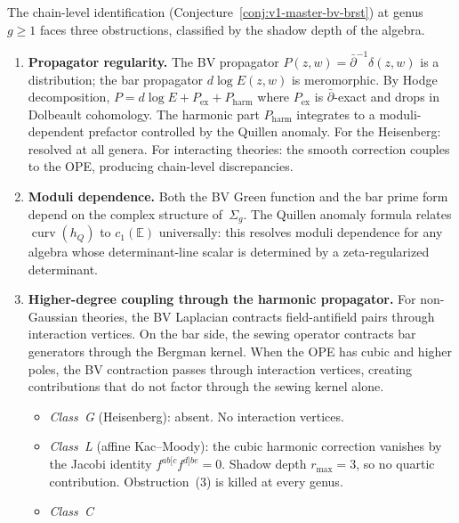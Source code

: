 \begin{proposition}
\label{prop:chain-level-three-obstructions}
The chain-level identification
\textup{(}Conjecture~\ref{conj:v1-master-bv-brst}\textup{)}
at genus $g \geq 1$
faces three obstructions, classified by the shadow depth
of the algebra.
\begin{enumerate}[label=\textup{(\arabic*)},nosep]
\item \textbf{Propagator regularity.}
 The BV propagator $P(z,w) = \bar\partial^{-1}\delta(z,w)$
 is a distribution; the bar propagator
 $d\log E(z,w)$ is meromorphic.
 By Hodge decomposition, $P = d\log E + P_{\mathrm{ex}}
 + P_{\mathrm{harm}}$
 where $P_{\mathrm{ex}}$ is $\bar\partial$-exact
 and drops in Dolbeault cohomology.
 The harmonic part $P_{\mathrm{harm}}$ integrates to a
 moduli-dependent prefactor controlled by the Quillen anomaly.
 For the Heisenberg: resolved at all genera.
 For interacting theories: the smooth correction couples to
 the OPE, producing chain-level discrepancies.
\item \textbf{Moduli dependence.}
 Both the BV Green function and the bar prime form
 depend on the complex structure of~$\Sigma_g$.
 The Quillen anomaly formula relates
 $\operatorname{curv}(h_Q)$ to $c_1(\mathbb{E})$
 universally: this resolves moduli dependence for any algebra
 whose determinant-line scalar is determined by a zeta-regularized
 determinant.
\item \textbf{Higher-degree coupling through the harmonic propagator.}
 For non-Gaussian theories, the BV Laplacian contracts
 field-antifield pairs through interaction vertices.
 On the bar side, the sewing operator contracts bar
 generators through the Bergman kernel.
 When the OPE has cubic and higher poles, the BV contraction
 passes through interaction vertices, creating contributions
 that do not factor through the sewing kernel alone.
 \begin{itemize}[nosep]
 \item \emph{Class~G} \textup{(}Heisenberg\textup{)}: absent.
 No interaction vertices.
 \item \emph{Class~L} \textup{(}affine Kac--Moody\textup{)}:
 the cubic harmonic correction vanishes by the Jacobi identity
 $f^{ab[c}f^{d]be} = 0$.
 Shadow depth $r_{\max} = 3$, so no quartic contribution.
 Obstruction~\textup{(3)} is killed at every genus.
 \item \emph{Class~C}

\end{itemize}
\end{enumerate}
\end{proposition}
